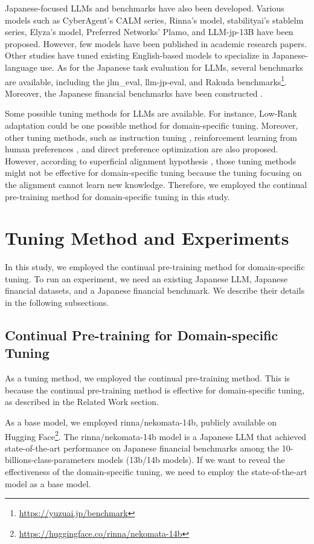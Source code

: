 Japanese-focused LLMs and benchmarks have also been developed.
Various models such as CyberAgent's CALM series, Rinna's model, stabilityai's stablelm series, Elyza's model, Preferred Networks' Plamo\texttrademark, and LLM-jp-13B have been proposed.
However, few models have been published in academic research papers.
Other studies have tuned existing English-based models to specialize in Japanese-language use\cite{Hirano2023-nbis,sukeda2023jmedlora,suzuki2023base}.
As for the Japanese task evaluation for LLMs, several benchmarks are available, including the jlm\_eval\cite{jlm_eval}, llm-jp-eval\cite{llm-jp-eval}, and Rakuda benchmarks\footnote{\url{https://yuzuai.jp/benchmark}}.
Moreover, the Japanese financial benchmarks have been constructed \cite{Hirano2023-finnlpkdf}.

Some possible tuning methods for LLMs are available.
For instance, Low-Rank adaptation \cite{hu2021lora} could be one possible method for domain-specific tuning.
Moreover, other tuning methods, such as instruction tuning \cite{wei2021finetuned}, reinforcement learning from human preferences \cite{christiano2017deep}, and direct preference optimization \cite{rafailov2024direct} are also proposed.
However, according to superficial alignment hypothesis \cite{zhou2024lima}, those tuning methods might not be effective for domain-specific tuning because the tuning focusing on the alignment cannot learn new knowledge.
Therefore, we employed the continual pre-training method for domain-specific tuning in this study.

\section{Tuning Method and Experiments}
In this study, we employed the continual pre-training method for domain-specific tuning.
To run an experiment, we need an existing Japanese LLM, Japanese financial datasets, and a Japanese financial benchmark.
We describe their details in the following subsections.

\subsection{Continual Pre-training for Domain-specific Tuning}
As a tuning method, we employed the continual pre-training method.
This is because the continual pre-training method is effective for domain-specific tuning, as described in the Related Work section.

As a base model, we employed rinna/nekomata-14b, publicly available on Hugging Face\footnote{\url{https://huggingface.co/rinna/nekomata-14b}}.
The rinna/nekomata-14b model is a Japanese LLM that achieved state-of-the-art performance on Japanese financial benchmarks among the 10-billions-class-parameters models (13b/14b models).
If we want to reveal the effectiveness of the domain-specific tuning, we need to employ the state-of-the-art model as a base model.


